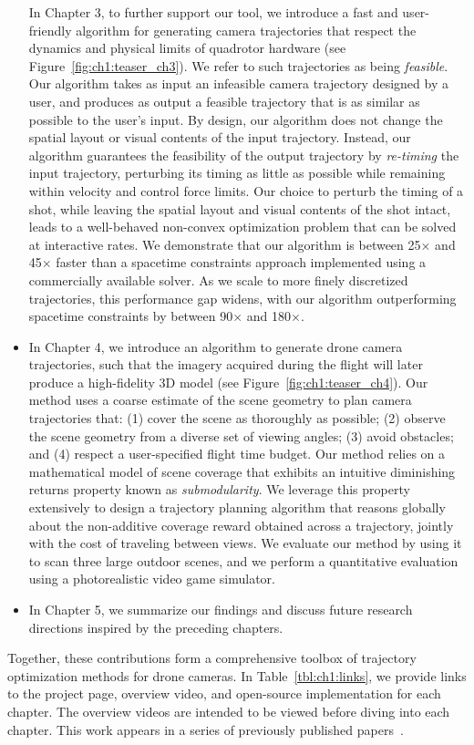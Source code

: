 \begin{itemize}
In Chapter 3, to further support our tool, we introduce a fast and user-friendly algorithm for generating camera trajectories that respect the dynamics and physical limits of quadrotor hardware (see Figure~\ref{fig:ch1:teaser_ch3}).
We refer to such trajectories as being \emph{feasible}.
Our algorithm takes as input an infeasible camera trajectory designed by a user, and produces as output a feasible trajectory that is as similar as possible to the user's input.
By design, our algorithm does not change the spatial layout or  visual contents of the input trajectory.
Instead, our algorithm guarantees the feasibility of the output trajectory by \emph{re-timing} the input trajectory, perturbing its timing as little as possible while remaining within velocity and control force limits.
Our choice to perturb the timing of a shot, while leaving the spatial layout and visual contents of the shot intact, leads to a well-behaved non-convex optimization problem that can be solved at interactive rates.
We demonstrate that our algorithm is between 25$\times$ and 45$\times$ faster than a spacetime constraints approach implemented using a commercially available solver.
As we scale to more finely discretized trajectories, this performance gap widens, with our algorithm outperforming spacetime constraints by between 90$\times$ and 180$\times$.

\item

In Chapter 4, we introduce an algorithm to generate drone camera trajectories, such that the imagery acquired during the flight will later produce a high-fidelity 3D model (see Figure~\ref{fig:ch1:teaser_ch4}). Our method uses a coarse estimate of the scene geometry to plan camera trajectories that: (1) cover the scene as thoroughly as possible; (2) observe the scene geometry from a diverse set of viewing angles; (3) avoid obstacles; and (4) respect a user-specified flight time
budget. Our method relies on a mathematical model of scene coverage that exhibits an intuitive diminishing returns property known as \emph{submodularity}.
We leverage this property extensively to design a trajectory planning algorithm  that reasons globally about the non-additive coverage reward obtained across a trajectory, jointly with the cost of traveling between views.
We evaluate our method by using it to scan three large outdoor scenes, and we perform a quantitative evaluation using a photorealistic video game simulator.

\item

In Chapter 5, we summarize our findings and discuss future research directions inspired by the preceding chapters.

\end{itemize}

\noindent Together, these contributions form a comprehensive toolbox of trajectory optimization methods for drone cameras.
In Table~\ref{tbl:ch1:links}, we provide links to the project page, overview video, and open-source implementation for each chapter.
The overview videos are intended to be viewed before diving into each chapter.
This work appears in a series of previously published papers~\cite{joubert:2015,roberts:2016,roberts:2017}.
